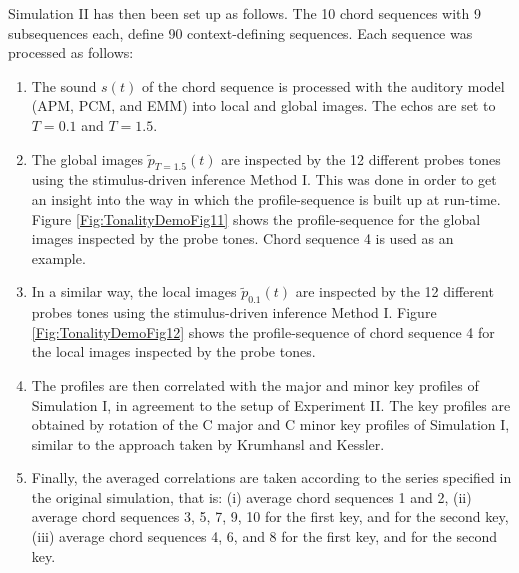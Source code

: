 Simulation II has then been set up as follows. The 10 chord
sequences with 9 subsequences each, define 90 context-defining
sequences. Each sequence was processed as follows:
\begin{enumerate}
\item
    The sound $s(t)$ of the chord sequence is processed with the
    auditory model (APM, PCM, and EMM) into local and global images.
    The echos are set to $T=0.1$ and $T=1.5$.
\item
    The global images $\tilde{p}_{T=1.5}(t)$ are inspected by the 12
    different probes tones using the stimulus-driven inference Method
    I. This was done in order to get an insight into the way in which
    the profile-sequence is built up at run-time. Figure
    \ref{Fig:TonalityDemoFig11} shows the profile-sequence for the global images
    inspected by the probe tones. Chord sequence 4 is used as an
    example.
\item
    In a similar way, the local images $\tilde{p}_{0.1}(t)$ are
    inspected by the 12 different probes tones using the
    stimulus-driven inference Method I. Figure \ref{Fig:TonalityDemoFig12} shows
    the profile-sequence of chord sequence 4 for the local images
    inspected by the probe tones.
\item
    The profiles are then correlated with the major and minor key
    profiles of Simulation I, in agreement to the setup of Experiment
    II. The key profiles are obtained by rotation of the C major and C
    minor key profiles of Simulation I, similar to the approach taken
    by Krumhansl and Kessler.
\item
    Finally, the averaged correlations are taken according to the
    series specified in the original simulation, that is: (i) average
    chord sequences 1 and 2, (ii) average chord sequences 3, 5, 7, 9,
    10 for the first key, and for the second key, (iii) average chord
    sequences 4, 6, and 8 for the first key, and for the second key.
\end{enumerate}

